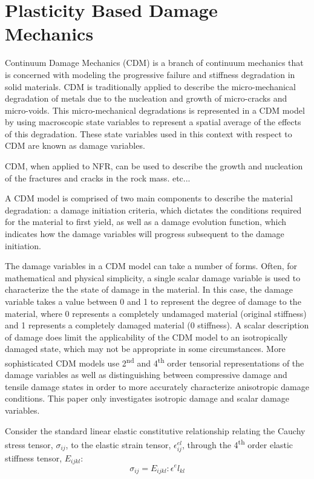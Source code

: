 \section{Plasticity Based Damage Mechanics}

Continuum Damage Mechanics (CDM) is a branch of continuum mechanics that is concerned with modeling the progressive failure and stiffness degradation in solid materials. CDM is traditionally applied to describe the micro-mechanical degradation of metals due to the nucleation and growth of micro-cracks and micro-voids. This micro-mechanical degradations is represented in a CDM model by using macroscopic state variables to represent a spatial average of the effects of this degradation. These state variables used in this context with respect to CDM are known as damage variables. 

CDM, when applied to NFR, can be used to describe the growth and nucleation of the fractures and cracks in the rock mass. etc...

A CDM model is comprised of two main components to describe the material degradation: a damage initiation criteria, which dictates the conditions required for the material to first yield, as well as a damage evolution function, which indicates how the damage variables will progress subsequent to the damage initiation. 

The damage variables in a CDM model can take a number of forms. Often, for mathematical and physical simplicity, a single scalar damage variable is used to characterize the the state of damage in the material. In this case, the damage variable takes a value between 0 and 1 to represent the degree of damage to the material, where 0 represents a completely undamaged material (original stiffness) and 1 represents a completely damaged material (0 stiffness). A scalar description of damage does limit the applicability of the CDM model to an isotropically damaged state, which may not be appropriate in some circumstances. More sophisticated CDM models use 2\textsuperscript{nd} and 4\textsuperscript{th} order tensorial representations of the damage variables as well as distinguishing between compressive damage and tensile damage states in order to more accurately characterize anisotropic damage conditions. This paper only investigates isotropic damage and scalar damage variables. 

Consider the standard linear elastic constitutive relationship relating the Cauchy stress tensor, $\sigma_{ij}$, to the elastic strain tensor, $\epsilon^{el}_{ij}$, through the 4\textsuperscript{th} order elastic stiffness tensor, $E_{ijkl}$:
\begin{equation}
\sigma_{ij} =E_{ijkl}:\epsilon^el_{kl}
\label{eqn:const3a}
\end{equation}

